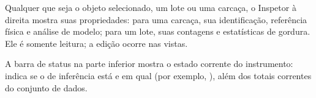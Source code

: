 \begin{note}[title={O Inspetor acompanha o objeto selecionado}]
Qualquer que seja o objeto selecionado, um lote ou uma carcaça, o Inspetor à
direita mostra suas propriedades: para uma carcaça, sua identificação, referência
física e análise de modelo; para um lote, suas contagens e estatísticas de gordura.
Ele é somente leitura; a edição ocorre nas vistas.
\end{note}

A barra de status na parte inferior mostra o estado corrente do instrumento: indica
se o  de inferência está  e em qual  (por
exemplo, ), além dos totais correntes do conjunto de dados.
